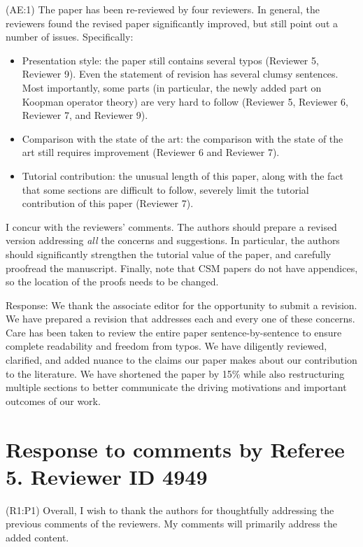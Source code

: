 \documentclass{letter}
\begin{document}
{\color{red}(AE:1)} The paper has been re-reviewed by four reviewers. In general, the reviewers found the revised paper significantly improved, but still point out a number of issues. Specifically:
\begin{itemize}
	\item Presentation style: the paper still contains several typos (Reviewer 5, Reviewer 9). Even the statement of revision has several clumsy sentences. Most importantly, some parts (in particular, the newly added	part on Koopman operator theory) are very hard to follow (Reviewer 5, Reviewer 6, Reviewer 7, and Reviewer 9).
	\item Comparison with the state of the art: the comparison with the state of the art still requires improvement (Reviewer 6 and Reviewer 7).
	\item Tutorial contribution: the unusual length of this paper, along with the fact that some sections are difficult to follow, severely limit the tutorial contribution of this paper (Reviewer 7).
\end{itemize}

I concur with the reviewers' comments. The authors should prepare a revised version addressing \emph{all} the concerns and suggestions. In particular, the authors should significantly strengthen the tutorial value of the paper, and carefully proofread the manuscript. Finally, note that CSM papers do not have appendices, so the location of the proofs needs to be changed.

{\color{red} Response:} We thank the associate editor for the opportunity to submit a revision.  We have prepared a revision that addresses each and every one of these concerns. Care has been taken to review the entire paper sentence-by-sentence to ensure complete readability and freedom from typos. We have diligently reviewed, clarified, and added nuance to the claims our paper makes about our contribution to the literature. We have shortened the paper by 15\% while also restructuring multiple sections to better communicate the driving motivations and important outcomes of our work.


\section{Response to comments by Referee 5. Reviewer ID 4949}

{\color{red}(R1:P1)} Overall, I wish to thank the authors for thoughtfully addressing the previous comments of the reviewers. My comments will primarily address the added content. 
\end{document}
